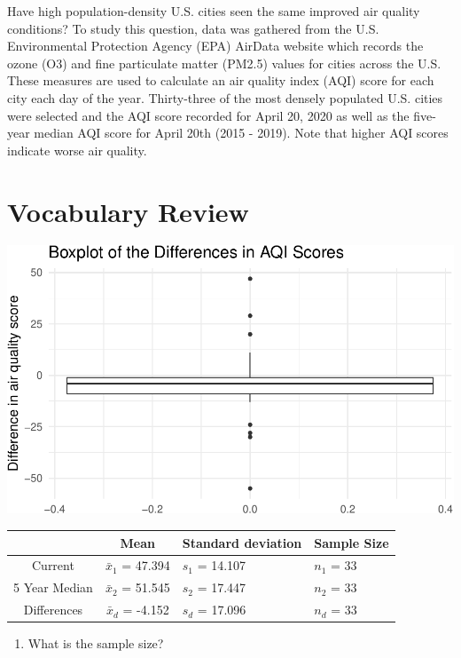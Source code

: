 \documentclass[
]{report}
\providecommand{\tightlist}{%
  \setlength{\itemsep}{0pt}\setlength{\parskip}{0pt}}
\begin{document}
Have high population-density U.S. cities seen the same improved air quality conditions? To study this question, data was gathered from the U.S. Environmental Protection Agency (EPA) AirData website which records the ozone (O3) and fine particulate matter (PM2.5) values for cities across the U.S. These measures are used to calculate an air quality index (AQI) score for each city each day of the year. Thirty-three of the most densely populated U.S. cities were selected and the AQI score recorded for April 20, 2020 as well as the five-year median AQI score for April 20th (2015 - 2019). Note that higher AQI scores indicate worse air quality.

\hypertarget{vocabulary-review-4}{%
\section{Vocabulary Review}\label{vocabulary-review-4}}

\begin{center}\includegraphics[width=0.7\linewidth]{08-paired_files/figure-latex/unnamed-chunk-2-1} \end{center}

\begin{longtable}[]{@{}ccll@{}}
\toprule
& Mean & Standard deviation & Sample Size\tabularnewline
\midrule
\endhead
Current & \(\bar{x}_1\) = 47.394 & \(s_1\) = 14.107 & \(n_1\) = 33\tabularnewline
5 Year Median & \(\bar{x}_2\) = 51.545 & \(s_2\) = 17.447 & \(n_2\) = 33\tabularnewline
Differences & \(\bar{x}_d\) = -4.152 & \(s_d\) = 17.096 & \(n_d\) = 33\tabularnewline
\bottomrule
\end{longtable}

\begin{enumerate}
\def\labelenumi{\arabic{enumi}.}
\tightlist
\item
  What is the sample size?
\end{enumerate}

\vspace{0.5in}
\end{document}
